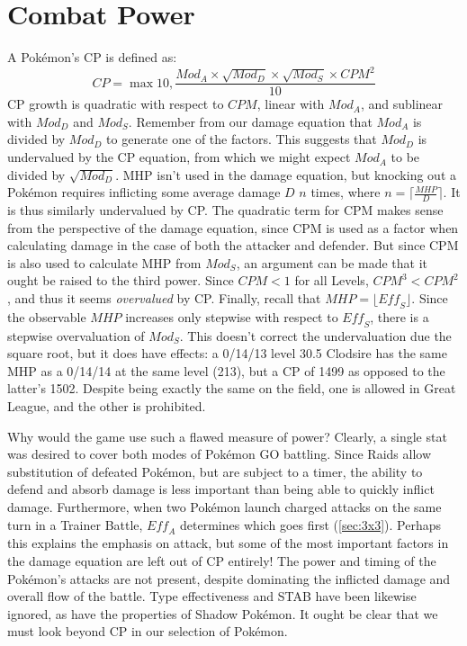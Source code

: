 \section{Combat Power\label{sec:cp}}
A Pokémon's CP is defined as:
\[ CP = \max{10, \frac{Mod_A \times \sqrt{Mod_D} \times \sqrt{Mod_S} \times CPM^2}{10}} \]
CP growth is quadratic with respect to $CPM$, linear with $Mod_A$, and
  sublinear with $Mod_D$ and $Mod_S$.
Remember from our damage equation that $Mod_A$ is divided by $Mod_D$
 to generate one of the factors.
This suggests that $Mod_D$ is undervalued by the CP equation, from which
 we might expect $Mod_A$ to be divided by $\sqrt{Mod_D}$.
MHP isn't used in the damage equation, but knocking out a Pokémon
 requires inflicting some average damage $D$ $n$ times,
 where $n = \lceil\frac{MHP}{D}\rceil$.
It is thus similarly undervalued by CP\@.
The quadratic term for CPM makes sense from the perspective of the damage
 equation, since CPM is used as a factor when calculating damage in the
 case of both the attacker and defender.
But since CPM is also used to calculate MHP from $Mod_S$, an argument
 can be made that it ought be raised to the third power.
Since $CPM < 1$ for all Levels, $CPM^3 < CPM^2$, and thus it seems \textit{overvalued} by CP\@.
Finally, recall that $MHP = \lfloor \mathit{Eff_S} \rfloor$.
Since the observable $MHP$ increases only stepwise with respect to $\mathit{Eff_S}$,
  there is a stepwise overvaluation of $Mod_S$.
This doesn't correct the undervaluation due the square root, but it does
  have effects: a 0/14/13 level 30.5 Clodsire has the same MHP
  as a 0/14/14 at the same level (213), but a CP of 1499 as
  opposed to the latter's 1502.
Despite being exactly the same on the field, one is allowed in Great League,
  and the other is prohibited.

Why would the game use such a flawed measure of power?
Clearly, a single stat was desired to cover both modes of Pokémon GO battling.
Since Raids allow substitution of defeated Pokémon, but are subject to a timer,
  the ability to defend and absorb damage is less important than being able to
  quickly inflict damage.
Furthermore, when two Pokémon launch charged attacks on the same turn in a Trainer
  Battle, $\mathit{Eff_A}$ determines which goes first (\autoref{sec:3x3}).
Perhaps this explains the emphasis on attack, but some of the most important
  factors in the damage equation are left out of CP entirely!
The power and timing of the Pokémon's attacks are not present, despite
  dominating the inflicted damage and overall flow of the battle.
Type effectiveness and STAB have been likewise ignored, as have the
  properties of Shadow Pokémon.
It ought be clear that we must look beyond CP in our selection of Pokémon.

